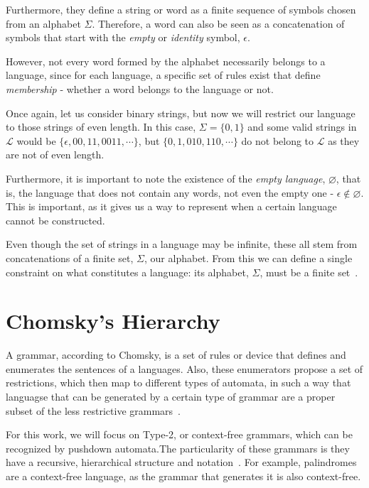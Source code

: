 Furthermore, they define a string or word as a finite sequence of symbols chosen from an alphabet $\Sigma$. Therefore, a word can also be seen as a concatenation of symbols that start with the \emph{empty} or \emph{identity} symbol, $\epsilon$.

However, not every word formed by the alphabet necessarily belongs to a language, since for each language, a specific set of rules exist that define \emph{membership} - whether a word belongs to the language or not. 

Once again, let us consider binary strings, but now we will restrict our language to those strings of even length. In this case, $\Sigma = \{ 0, 1\}$ and some valid strings in $\mathcal{L}$ would be $\{ \epsilon, 00, 11, 0011, \cdots \}$, but $\{ 0, 1, 010, 110, \cdots \}$ do not belong to $\mathcal{L}$ as they are not of even length.

Furthermore, it is important to note the existence of the \emph{empty language}, $\varnothing$, that is, the language that does not contain any words, not even the empty one - $\epsilon \notin \varnothing$. This is important, as it gives us a way to represent when a certain language cannot be constructed.

Even though the set of strings in a language may be infinite, these all stem from concatenations of a finite set, $\Sigma$, our alphabet. From this we can define a single constraint on what constitutes a language: its alphabet, $\Sigma$, must be a finite set~\cite{hopcroft-automata}.

\section{Chomsky's Hierarchy}
A grammar, according to Chomsky, is a set of rules or device that defines and enumerates the sentences of a languages. Also, these enumerators propose a set of restrictions, which then map to different types of automata, in such a way that  languagse that can be generated by a certain type of grammar are a proper subset of the less restrictive grammars~\cite{chomsky-hierarchy}.

For this work, we will focus on Type-2, or context-free grammars, which can be recognized by pushdown automata.The particularity of these grammars is they have a recursive, hierarchical structure and notation~\cite{hopcroft-automata}. For example, palindromes are a context-free language, as the grammar that generates it is also context-free.

